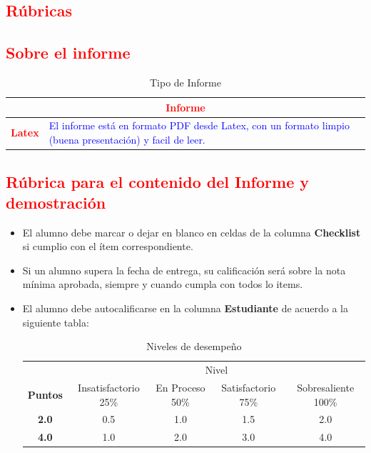 \documentclass{article}
\begin{document}
\begin{itemize}
\section{\textcolor{red}{Rúbricas}}
	
	\subsection{\textcolor{red}{Sobre el informe}}
	\begin{table}[H]
		\caption{Tipo de Informe}
		\setlength{\tabcolsep}{0.5em} %
		{\renewcommand{\arraystretch}{1.5}%
		\begin{tabular}{|p{3cm}|p{12cm}|}
			\hline
			\multicolumn{2}{|c|}{\textbf{\textcolor{red}{Informe}}}  \\
			\hline 
			\textbf{\textcolor{red}{Latex}} & \textcolor{blue}{El informe está en formato PDF desde Latex,  con un formato limpio (buena presentación) y facil de leer.}   \\ 
			\hline 
			
			
		\end{tabular}
	}
	\end{table}


	\subsection{\textcolor{red}{Rúbrica para el contenido del Informe y demostración}}
	\begin{itemize}			
		\item El alumno debe marcar o dejar en blanco en celdas de la columna \textbf{Checklist} si cumplio con el ítem correspondiente.
		\item Si un alumno supera la fecha de entrega,  su calificación será sobre la nota mínima aprobada, siempre y cuando cumpla con todos lo items.
		\item El alumno debe autocalificarse en la columna \textbf{Estudiante} de acuerdo a la siguiente tabla:
	
		\begin{table}[ht]
			\caption{Niveles de desempeño}
			\begin{center}
			\begin{tabular}{ccccc}
    			\hline
    			 & \multicolumn{4}{c}{Nivel}\\
    			\cline{1-5}
    			\textbf{Puntos} & Insatisfactorio 25\%& En Proceso 50\% & Satisfactorio 75\% & Sobresaliente 100\%\\
    			\textbf{2.0}&0.5&1.0&1.5&2.0\\
    			\textbf{4.0}&1.0&2.0&3.0&4.0\\
    		\hline
			\end{tabular}
		\end{center}
	\end{table}	
	

\end{itemize}
\end{itemize}
\end{document}

